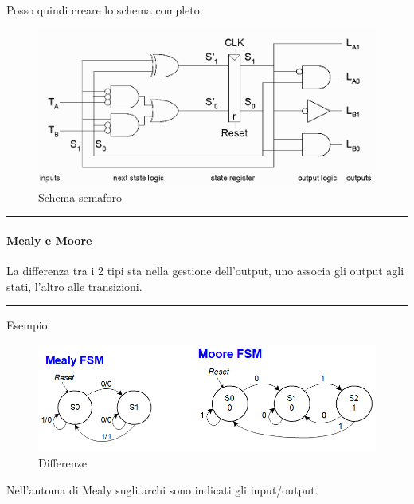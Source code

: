 \documentclass{article}
\begin{document}
\newpage

Posso quindi creare lo schema completo:

\begin{figure}[ht]
    \centering
    \includegraphics[width=\linewidth]{semaforo_schema.png}
    \caption{Schema semaforo}
    \label{fig:semaforo_schema}
\end{figure}

\noindent\rule{\textwidth}{0.5pt}

\vspace{10pt}

\paragraph{Mealy e Moore}

La differenza tra i 2 tipi sta nella gestione dell'output, uno associa gli output agli stati, l'altro alle transizioni.

\noindent\rule{\textwidth}{0.5pt}

Esempio:

\vspace{3pt}

\begin{figure}[ht]
    \centering
    \includegraphics[width=\linewidth]{mm_fsm.png}
    \caption{Differenze}
    \label{fig:fsm_mm}
\end{figure}

Nell'automa di Mealy sugli archi sono indicati gli input/output.
\end{document}
